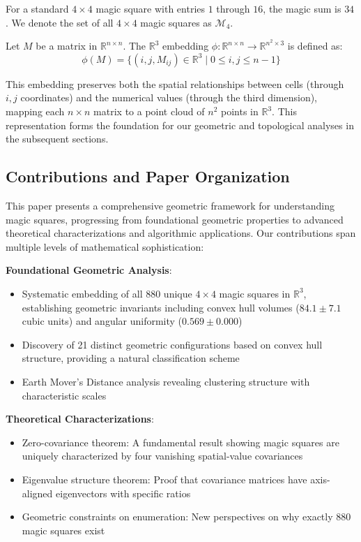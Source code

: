 For a standard $4 \times 4$ magic square with entries $1$ through $16$, the magic sum is $34$. We denote the set of all $4 \times 4$ magic squares as $\mathcal{M}_4$.

\begin{definition}
Let $M$ be a matrix in $\mathbb{R}^{n \times n}$. The $\mathbb{R}^3$ embedding $\phi: \mathbb{R}^{n \times n} \rightarrow \mathbb{R}^{n^2 \times 3}$ is defined as:
\[\phi(M) = \{(i, j, M_{ij}) \in \mathbb{R}^3 \mid 0 \leq i, j \leq n-1\}\]
\end{definition}

This embedding preserves both the spatial relationships between cells (through $i,j$ coordinates) and the numerical values (through the third dimension), mapping each $n \times n$ matrix to a point cloud of $n^2$ points in $\mathbb{R}^3$. This representation forms the foundation for our geometric and topological analyses in the subsequent sections.

\subsection{Contributions and Paper Organization}

This paper presents a comprehensive geometric framework for understanding magic squares, progressing from foundational geometric properties to advanced theoretical characterizations and algorithmic applications. Our contributions span multiple levels of mathematical sophistication:

\textbf{Foundational Geometric Analysis}:
\begin{itemize}
    \item Systematic embedding of all 880 unique $4 \times 4$ magic squares in $\mathbb{R}^3$, establishing geometric invariants including convex hull volumes ($84.1 \pm 7.1$ cubic units) and angular uniformity ($0.569 \pm 0.000$)
    \item Discovery of 21 distinct geometric configurations based on convex hull structure, providing a natural classification scheme
    \item Earth Mover's Distance analysis revealing clustering structure with characteristic scales
\end{itemize}

\textbf{Theoretical Characterizations}:
\begin{itemize}
    \item Zero-covariance theorem: A fundamental result showing magic squares are uniquely characterized by four vanishing spatial-value covariances
    \item Eigenvalue structure theorem: Proof that covariance matrices have axis-aligned eigenvectors with specific ratios
    \item Geometric constraints on enumeration: New perspectives on why exactly 880 magic squares exist
\end{itemize}


